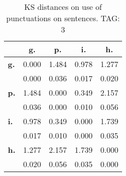 \begin{table}[h!]
\begin{center}
\begin{tabular}{| l || c | c | c | c |}\hline
 & {\bf g.} & {\bf p.} & {\bf i.} & {\bf h.} \\\hline\hline
{\bf g.} & 0.000 & 1.484 & 0.978 & 1.277 \\
{\bf } & 0.000 & 0.036 & 0.017 & 0.020 \\\hline
{\bf p.} & 1.484 & 0.000 & 0.349 & 2.157 \\
{\bf } & 0.036 & 0.000 & 0.010 & 0.056 \\\hline
{\bf i.} & 0.978 & 0.349 & 0.000 & 1.739 \\
{\bf } & 0.017 & 0.010 & 0.000 & 0.035 \\\hline
{\bf h.} & 1.277 & 2.157 & 1.739 & 0.000 \\
{\bf } & 0.020 & 0.056 & 0.035 & 0.000 \\\hline
\end{tabular}
\caption{KS distances on use of punctuations on sentences. TAG: 3}
\end{center}
\end{table}